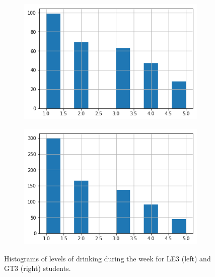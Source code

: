 \documentclass[11pt]{article}
\begin{document}
\begin{figure}[h!]
  \captionsetup{justification=centering}
  \centering
  \begin{subfigure}[b]{0.4\linewidth}
    \includegraphics[width=\linewidth]{le3.png}
  \end{subfigure}
  \hspace{10mm}
  \begin{subfigure}[b]{0.4\linewidth}
    \includegraphics[width=\linewidth]{gt3.png}
  \end{subfigure}
  \caption{Histograms of levels of drinking during the week for LE3 (left) and GT3 (right) students.}
  \label{fig:coffee}
\end{figure}
\end{document}
